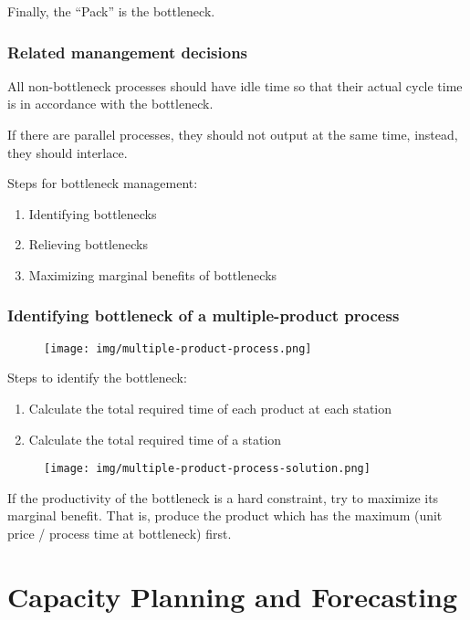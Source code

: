 \documentclass{article}
\begin{document}
Finally, the ``Pack'' is the bottleneck.

\subsubsection{Related manangement decisions}

All non-bottleneck processes should have idle time so that their actual
cycle time is in accordance with the bottleneck.

If there are parallel processes, they should not output at the same time,
instead, they should interlace.

Steps for bottleneck management:
\begin{enumerate}
	\item Identifying bottlenecks
	\item Relieving bottlenecks
	\item Maximizing marginal benefits of bottlenecks
\end{enumerate}

\subsubsection{Identifying bottleneck of a multiple-product process}

\begin{figure}[H]
	\centering
	\texttt{[image: img/multiple-product-process.png]}
\end{figure}

Steps to identify the bottleneck:
\begin{enumerate}
	\item Calculate the total required time of each product at each station
	\item Calculate the total required time of a station
\end{enumerate}

\begin{figure}[H]
	\centering
	\texttt{[image: img/multiple-product-process-solution.png]}
\end{figure}

If the productivity of the bottleneck is a hard constraint, try to maximize its marginal benefit.
That is, produce the product which has the maximum (unit price / process time at bottleneck) first.

\section{Capacity Planning and Forecasting}
\end{document}
